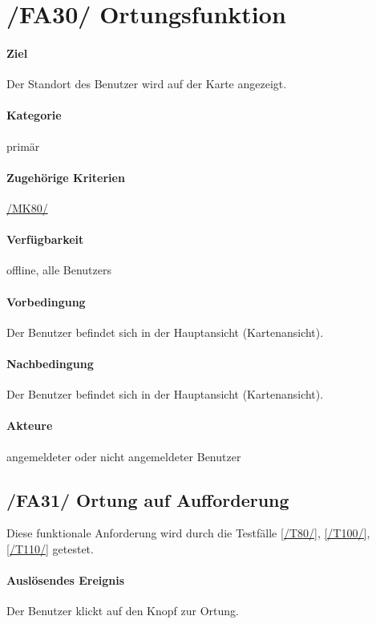 \section[Ortungsfunktion]{/FA30/ Ortungsfunktion}
\label{/FA30/}
\paragraph{Ziel}
Der Standort des \Gls{Benutzer} wird auf der \Gls{Karte} angezeigt.
\paragraph{Kategorie}
primär
\paragraph{Zugehörige Kriterien}
\hyperref[/MK80/]{/MK80/}
\paragraph{Verfügbarkeit}
\gls{offline}, alle \Glspl{Benutzer}
\paragraph{Vorbedingung}
Der \Gls{Benutzer} befindet sich in der Hauptansicht (\Gls{Kartenansicht}).
\paragraph{Nachbedingung}
Der \Gls{Benutzer} befindet sich in der Hauptansicht (\Gls{Kartenansicht}).
\paragraph{Akteure}
angemeldeter oder nicht angemeldeter \Gls{Benutzer}

\subsection*{/FA31/ Ortung auf Aufforderung}
\label{/FA31/}
Diese funktionale Anforderung wird durch die Testfälle \ref{/T80/}, \ref{/T100/}, \ref{/T110/} getestet.
\paragraph{Auslösendes Ereignis}
Der \Gls{Benutzer} klickt auf den Knopf zur Ortung.
